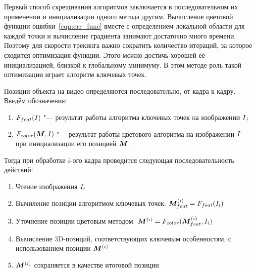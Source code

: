 
Первый способ скрещивания алгоритмов заключается в последовательном их
применении и инициализации одного метода другим.
Вычисление цветовой функции ошибки~\ref{eqn:err_func} вместе с определением
локальной области для каждой точки и вычисление градиента занимают достаточно
много времени.
Поэтому для скорости трекинга важно сократить количество итераций, за которое
сходится оптимизация функции.
Этого можно достичь хорошей её инициализацией, близкой к глобальному
минимуму.
В этом методе роль такой оптимизации играет алгоритм ключевых точек.

\newcommand{\FeatAlg}{\ensuremath{F_{feat}}}
\newcommand{\ColorAlg}{\ensuremath{F_{color}}}
\newcommand{\PoseOnFrame}[1]{\ensuremath{\Pose^{\left( #1 \right)}}}
\newcommand{\PoseI}{\ensuremath{\PoseOnFrame{i}}}
\newcommand{\FeatPoseI}{\ensuremath{\PoseI_{feat}}}
\newcommand{\FeatPose}{\ensuremath{\Pose_{feat}}}

\newcommand{\XOld}{\ensuremath{\homv{x_{old}}}}
\newcommand{\XNew}{\ensuremath{\homv{x_{new}}}}
\newcommand{\ReprErr}[1]{\ensuremath{\homv{e}( #1 )}}

Позиции объекта на видео определяются последовательно, от кадра к кадру.
Введём обозначения:

\begin{enumerate}
\item $\FeatAlg(\Img)$ "--- результат работы алгоритма ключевых точек на
изображении $I$;
\item $\ColorAlg(\Pose, \Img)$ "--- результат работы цветового алгоритма на
изображении $I$
при инициализации его позицией $\bm{M}$.
\end{enumerate}

Тогда при обработке $i$-ого кадра проводится следующая последовательность
действий:

\begin{enumerate}
\item Чтение изображения $I_i$
\item Вычиление позиции алгоритмом ключевых точек:
    $\FeatPoseI = \FeatAlg(\Img_i)$
\item Уточнение позиции цветовым методом:
    $\PoseI = \ColorAlg(\FeatPoseI, \Img_i)$
\item Вычисление  3D-позиций, соответствующих ключевым особенностям, с
    использованием позиции $\PoseI$
\item $\PoseI$ сохраняется в качестве итоговой позиции
\end{enumerate}


